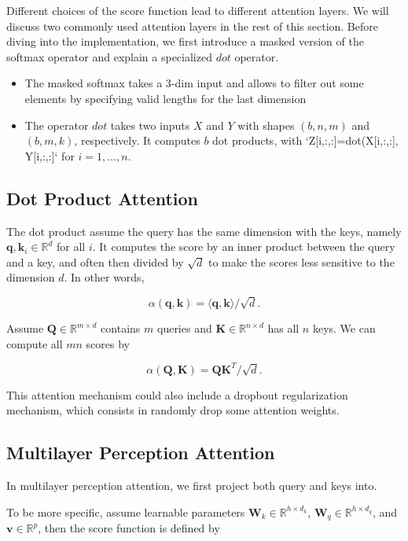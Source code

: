 Different choices of the score function lead to different attention layers. 
We will discuss two commonly used attention layers in the rest of this section. Before diving into the implementation, we first introduce a masked version of the softmax operator and explain a specialized $dot$ operator.

\begin{itemize}
    \item The masked softmax takes a 3-dim input and allows to filter out some elements by specifying valid lengths for the last dimension
    \item The operator $dot$ takes two inputs $X$ and $Y$ with shapes $(b, n, m)$ and $(b, m, k)$, respectively. It computes $b$ dot products, with `Z[i,:,:]=dot(X[i,:,:], Y[i,:,:]` for $i=1,\ldots,n$.   
\end{itemize}

\subsection{Dot Product Attention}

The dot product assume the query has the same dimension with the keys, namely $\mathbf q, \mathbf k_i \in\mathbb R^d$ for all $i$. It computes the score by an inner product between the query and a key, and often then divided by $\sqrt{d}$ to make the scores less sensitive to the dimension $d$. In other words,

$$\alpha(\mathbf q, \mathbf k) = \langle \mathbf q, \mathbf k \rangle /\sqrt{d}.$$

Assume $\mathbf Q\in\mathbb R^{m\times d}$ contains $m$ queries and $\mathbf K\in\mathbb R^{n\times d}$ has all $n$ keys. We can compute all $mn$ scores by

$$\alpha(\mathbf Q, \mathbf K) = \mathbf Q \mathbf K^T /\sqrt{d}.$$

This attention mechanism could also include a dropbout regularization mechanism, which consists in randomly drop some attention weights.

\subsection{Multilayer Perception Attention}

In multilayer perception attention, we first project both query and keys into.

To be more specific, assume learnable parameters $\mathbf W_k\in\mathbb R^{h\times d_k}$, $\mathbf W_q\in\mathbb R^{h\times d_q}$, and $\mathbf v\in\mathbb R^{p}$, then the score function is defined by


